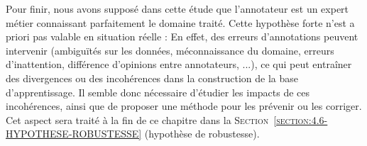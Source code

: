 			Pour finir, nous avons supposé dans cette étude que l'annotateur est un expert métier connaissant parfaitement le domaine traité.
			Cette hypothèse forte n'est a priori pas valable en situation réelle : En effet, des erreurs d'annotations peuvent intervenir (ambiguïtés sur les données, méconnaissance du domaine, erreurs d'inattention, différence d'opinions entre annotateurs, ...), ce qui peut entraîner des divergences ou des incohérences dans la construction de la base d'apprentissage.
			Il semble donc nécessaire d'étudier les impacts de ces incohérences, ainsi que de proposer une méthode pour les prévenir ou les corriger.
			Cet aspect sera traité à la fin de ce chapitre dans la \textsc{Section~\ref{section:4.6-HYPOTHESE-ROBUSTESSE}} (hypothèse de robustesse).